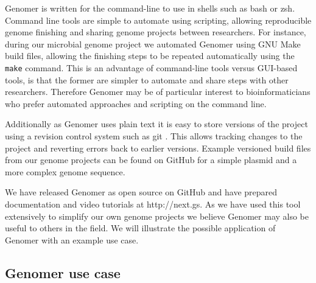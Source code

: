 \documentclass[10pt]{article}
\begin{document}
Genomer is written for the command-line to use in shells such as bash or zsh.
Command line tools are simple to automate using scripting, allowing
reproducible genome finishing and sharing genome projects between researchers.
For instance, during our microbial genome project we automated Genomer using
GNU Make build files, allowing the finishing steps to be repeated automatically
using the \verb+make+ command. This is an advantage of command-line tools
versus GUI-based tools, is that the former are simpler to automate and share
steps with other researchers. Therefore Genomer may be of particular interest
to bioinformaticians who prefer automated approaches and scripting on the
command line.

Additionally as Genomer uses plain text it is easy to store versions of the
project using a revision control system such as git \cite{git-scm}. This allows
tracking changes to the project and reverting errors back to earlier versions.
Example versioned build files from our genome projects can be found on GitHub
for a simple plasmid \cite{plasmid-github} and a more complex genome
\cite{genome-github} sequence.

We have released Genomer as open source on GitHub \cite{genomer-github} and
have prepared documentation and video tutorials at http://next.gs. As we have
used this tool extensively to simplify our own genome projects we believe
Genomer may also be useful to others in the field. We will illustrate the
possible application of Genomer with an example use case.

\subsection*{Genomer use case}
\end{document}
